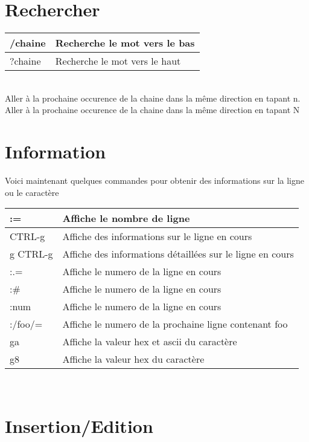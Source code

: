 \documentclass{article}
\begin{document}
\section{Rechercher}
\begin{tabular}{|p{3cm}| l| }
\hline
/chaine & Recherche le mot vers le bas\\ \hline
?chaine & Recherche le mot vers le haut\\ \hline
\end{tabular}\\

\noindent
Aller à la prochaine occurence de la chaine dans la même direction en tapant n.\\
Aller à la prochaine occurence de la chaine dans la même direction en tapant N

\section{Information}
Voici maintenant quelques commandes pour obtenir des informations sur la ligne ou le caractère\\


\begin{tabular}{|p{3cm}| l| }
\hline
:= & Affiche le nombre de ligne\\ \hline
CTRL-g & Affiche des informations sur le ligne en cours\\ \hline
g CTRL-g & Affiche des informations détaillées sur le ligne en cours\\ \hline
:.= & Affiche le numero de la ligne en cours\\ \hline
:\# & Affiche le numero de la ligne en cours\\ \hline
:num & Affiche le numero de la ligne en cours\\ \hline
:/foo/= & Affiche le numero de la prochaine ligne contenant foo\\ \hline
ga & Affiche la valeur hex et ascii du caractère\\ \hline
g8 & Affiche la valeur hex du caractère\\ \hline
\end{tabular}\\

\section{Insertion/Edition}
\end{document}
